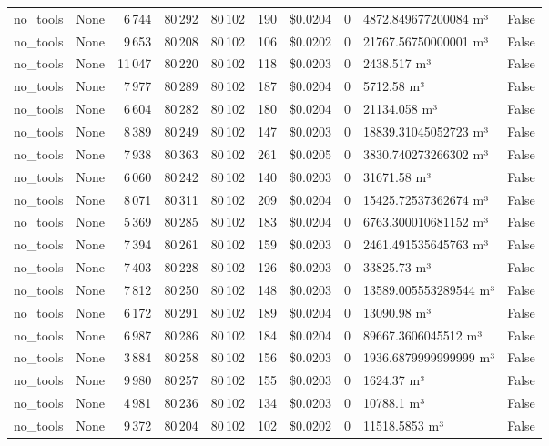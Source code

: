 \documentclass[a4paper,11pt]{article}
\begin{document}
\begin{table}[H]
{\begin{tabular}{l r r r r r r r l r}
no\_tools & None & 6\,744 & 80\,292 & 80\,102 & 190 & \$0.0204 & 0 & 4872.849677200084 m³ & False \\
no\_tools & None & 9\,653 & 80\,208 & 80\,102 & 106 & \$0.0202 & 0 & 21767.56750000001 m³ & False \\
no\_tools & None & 11\,047 & 80\,220 & 80\,102 & 118 & \$0.0203 & 0 & 2438.517 m³ & False \\
no\_tools & None & 7\,977 & 80\,289 & 80\,102 & 187 & \$0.0204 & 0 & 5712.58 m³ & False \\
no\_tools & None & 6\,604 & 80\,282 & 80\,102 & 180 & \$0.0204 & 0 & 21134.058 m³ & False \\
no\_tools & None & 8\,389 & 80\,249 & 80\,102 & 147 & \$0.0203 & 0 & 18839.31045052723 m³ & False \\
no\_tools & None & 7\,938 & 80\,363 & 80\,102 & 261 & \$0.0205 & 0 & 3830.740273266302 m³ & False \\
no\_tools & None & 6\,060 & 80\,242 & 80\,102 & 140 & \$0.0203 & 0 & 31671.58 m³ & False \\
no\_tools & None & 8\,071 & 80\,311 & 80\,102 & 209 & \$0.0204 & 0 & 15425.72537362674 m³ & False \\
no\_tools & None & 5\,369 & 80\,285 & 80\,102 & 183 & \$0.0204 & 0 & 6763.300010681152 m³ & False \\
no\_tools & None & 7\,394 & 80\,261 & 80\,102 & 159 & \$0.0203 & 0 & 2461.491535645763 m³ & False \\
no\_tools & None & 7\,403 & 80\,228 & 80\,102 & 126 & \$0.0203 & 0 & 33825.73 m³ & False \\
no\_tools & None & 7\,812 & 80\,250 & 80\,102 & 148 & \$0.0203 & 0 & 13589.005553289544 m³ & False \\
no\_tools & None & 6\,172 & 80\,291 & 80\,102 & 189 & \$0.0204 & 0 & 13090.98 m³ & False \\
no\_tools & None & 6\,987 & 80\,286 & 80\,102 & 184 & \$0.0204 & 0 & 89667.3606045512 m³ & False \\
no\_tools & None & 3\,884 & 80\,258 & 80\,102 & 156 & \$0.0203 & 0 & 1936.6879999999999 m³ & False \\
no\_tools & None & 9\,980 & 80\,257 & 80\,102 & 155 & \$0.0203 & 0 & 1624.37 m³ & False \\
no\_tools & None & 4\,981 & 80\,236 & 80\,102 & 134 & \$0.0203 & 0 & 10788.1 m³ & False \\
no\_tools & None & 9\,372 & 80\,204 & 80\,102 & 102 & \$0.0202 & 0 & 11518.5853 m³ & False \\

\end{tabular}}
\end{table}
\end{document}
